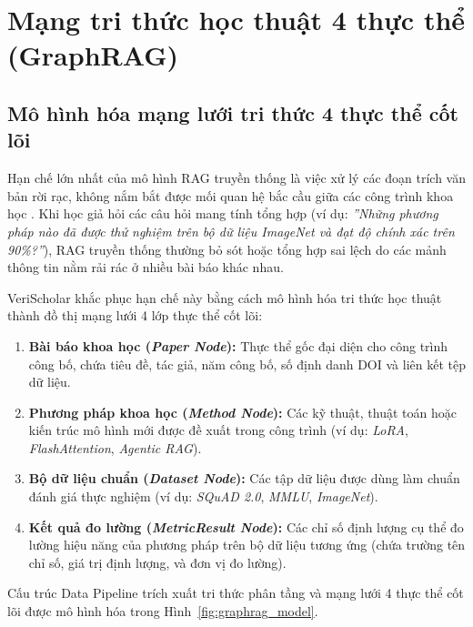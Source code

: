 \section{Mạng tri thức học thuật 4 thực thể (GraphRAG)}
\label{sec:graphrag}

\subsection{Mô hình hóa mạng lưới tri thức 4 thực thể cốt lõi}
\label{subsec:mo_hinh_graph}
Hạn chế lớn nhất của mô hình RAG truyền thống là việc xử lý các đoạn trích văn bản rời rạc, không nắm bắt được mối quan hệ bắc cầu giữa các công trình khoa học \cite{edge2024}. Khi học giả hỏi các câu hỏi mang tính tổng hợp (ví dụ: \textit{''Những phương pháp nào đã được thử nghiệm trên bộ dữ liệu ImageNet và đạt độ chính xác trên 90\%?''}), RAG truyền thống thường bỏ sót hoặc tổng hợp sai lệch do các mảnh thông tin nằm rải rác ở nhiều bài báo khác nhau.

VeriScholar khắc phục hạn chế này bằng cách mô hình hóa tri thức học thuật thành đồ thị mạng lưới 4 lớp thực thể cốt lõi:
\begin{enumerate}[label=\textbf{(\arabic*)}]
    \item \textbf{Bài báo khoa học (\textit{Paper Node}):} Thực thể gốc đại diện cho công trình công bố, chứa tiêu đề, tác giả, năm công bố, số định danh DOI và liên kết tệp dữ liệu.
    \item \textbf{Phương pháp khoa học (\textit{Method Node}):} Các kỹ thuật, thuật toán hoặc kiến trúc mô hình mới được đề xuất trong công trình (ví dụ: \textit{LoRA}, \textit{FlashAttention}, \textit{Agentic RAG}).
    \item \textbf{Bộ dữ liệu chuẩn (\textit{Dataset Node}):} Các tập dữ liệu được dùng làm chuẩn đánh giá thực nghiệm (ví dụ: \textit{SQuAD 2.0}, \textit{MMLU}, \textit{ImageNet}).
    \item \textbf{Kết quả đo lường (\textit{MetricResult Node}):} Các chỉ số định lượng cụ thể đo lường hiệu năng của phương pháp trên bộ dữ liệu tương ứng (chứa trường tên chỉ số, giá trị định lượng, và đơn vị đo lường).
\end{enumerate}

Cấu trúc Data Pipeline trích xuất tri thức phân tầng và mạng lưới 4 thực thể cốt lõi được mô hình hóa trong Hình~\ref{fig:graphrag_model}.

